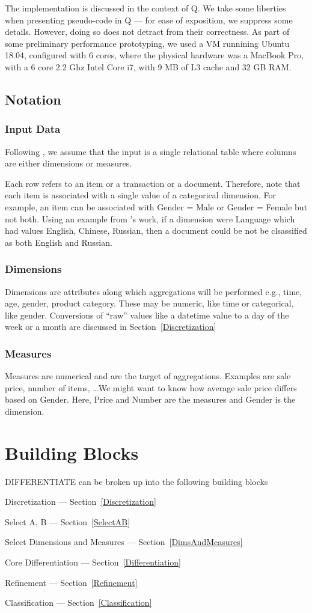 The implementation is discussed in the context of Q. We take some liberties when
presenting pseudo-code in Q --- for ease of exposition, we suppress some
details. However, doing so does not detract from their correctness.
As part of some preliminary performance prototyping, we used a VM runnining
Ubuntu 18.04, configured with 6 cores, where the physical hardware was a MacBook
Pro, with a 6 core 2.2 Ghz Intel Core i7, with 9 MB of L3 cache and 32 GB RAM.


\subsection{Notation}
\subsubsection{Input Data}
Following \cite{Fagin05}, we assume that the input is a 
single relational
table where columns are either dimensions or measures. 

Each row refers to an item or a transaction or a document. 
Therefore, note that each item is associated with a single value of a
categorical dimension. For example, an item can be associated with Gender = Male
or Gender = Female but not both.
Using an example from \cite{Fagin05}'s work, if a dimension were Language which had 
values English, Chinese, Russian, then a document could be not be clsassified as
both English and Russian.


\subsubsection{Dimensions}
Dimensions are
attributes along which aggregations will be performed e.g., time, age,
gender, product category. These may be numeric, like time or
categorical, like gender.
Conversions of ``raw'' values like a datetime value to a day of the week or a
month are discussed in Section~\ref{Discretization}

\subsubsection{Measures}
Measures are numerical and are the target of aggregations. Examples are sale
price, number of items, \ldots We might want to know how average sale price
differs based on Gender. Here, Price and Number are the measures and Gender is
the dimension.

\section{Building Blocks}
DIFFERENTIATE can be broken up into the following building blocks
\be
\item Discretization --- Section~\ref{Discretization}
\item Select A, B  --- Section~\ref{SelectAB}
\item Select Dimensions and Measures --- Section~\ref{DimsAndMeasures}
\item Core Differentiation  --- Section~\ref{Differentiation}
\item Refinement --- Section~\ref{Refinement}
\item Classification --- Section~\ref{Classification}
\ee



